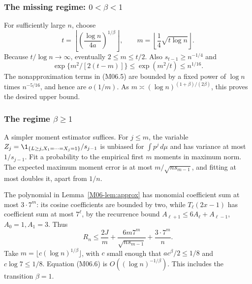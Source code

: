 \documentclass[11pt,a4paper]{article}
\theoremstyle{definition}\newtheorem{definition}[theorem]{Definition}
\theoremstyle{remark}\newtheorem{remark}[theorem]{Remark}
\numberwithin{equation}{section}
\begin{document}
\subsubsection{The missing regime: $0<\beta<1$}
For sufficiently large $n$, choose
\[
 t=\left\lfloor\left(\frac{\log n}{4a}\right)^{1/\beta}\right\rfloor,
 \qquad m=\left\lfloor\frac14\sqrt{t\log n}\right\rfloor.
\]
Because $t/\log n\to\infty$, eventually $2\le m\le t/2$. Also $s_{t-1}\ge n^{-1/4}$ and
\[
 \exp\{m^2/[2(t-m)]\}\le\exp(m^2/t)\le n^{1/16}.
\]
The nonapproximation terms in (M06.5) are bounded by a fixed power of $\log n$ times $n^{-5/16}$, and hence are $o(1/m)$. As
$m\asymp(\log n)^{(1+\beta)/(2\beta)}$, this proves the desired upper bound.

\subsubsection{The regime $\beta\ge1$}
A simpler moment estimator suffices. For $j\le m$, the variable
$Z_j=\1_{\{L\ge j,X_1=\cdots=X_j=1\}}/s_{j-1}$ is unbiased for $\int p^j\,d\mu$ and has variance at most $1/s_{j-1}$. Fit a probability to the empirical first $m$ moments in maximum norm. The expected maximum moment error is at most $m/\sqrt{ns_{m-1}}$, and fitting at most doubles it, apart from $1/n$.

The polynomial in Lemma~\ref{M06-lem:approx} has monomial coefficient sum at most $3\cdot7^m$: its cosine coefficients are bounded by two, while $T_\ell(2x-1)$ has coefficient sum at most $7^\ell$, by the recurrence bound $A_{\ell+1}\le6A_\ell+A_{\ell-1}$, $A_0=1,A_1=3$. Thus
\[
 R_n\le\frac{2J}{m}+\frac{6m7^m}{\sqrt{ns_{m-1}}}+\frac{3\cdot7^m}{n}.
\tag{M06.6}
\]
Take $m=\lfloor c(\log n)^{1/\beta}\rfloor$, with $c$ small enough that $ac^\beta/2\le1/8$ and $c\log7\le1/8$. Equation (M06.6) is $O((\log n)^{-1/\beta})$. This includes the transition $\beta=1$.
\end{document}

